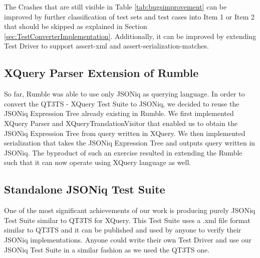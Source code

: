 The Crashes that are still visible in Table \ref{tab:bugsimprovement} can be improved by further classification of test sets and test cases into Item 1 or Item 2 that should be skipped as explained in Section \ref{sec:TestConverterImplementation}. Additionally, it can be improved by extending Test Driver to support assert-xml and assert-serialization-matches.

\subsection{XQuery Parser Extension of Rumble}
So far, Rumble was able to use only JSONiq as querying language. In order to convert the QT3TS - XQuery Test Suite to JSONiq, we decided to reuse the JSONiq Expression Tree already existing in Rumble. We first implemented XQuery Parser and XQueryTranslationVisitor that enabled us to obtain the JSONiq Expression Tree from query written in XQuery. We then implemented serialization that takes the JSONiq Expression Tree and outputs query written in JSONiq. The byproduct of such an exercise resulted in extending the Rumble such that it can now operate using XQuery language as well.

\subsection{Standalone JSONiq Test Suite}
One of the most significant achievements of our work is producing purely JSONiq Test Suite similar to QT3TS for XQuery. This Test Suite uses a .xml file format similar to QT3TS and it can be published and used by anyone to verify their JSONiq implementations. Anyone could write their own Test Driver and use our JSONiq Test Suite in a similar fashion as we used the QT3TS one.

